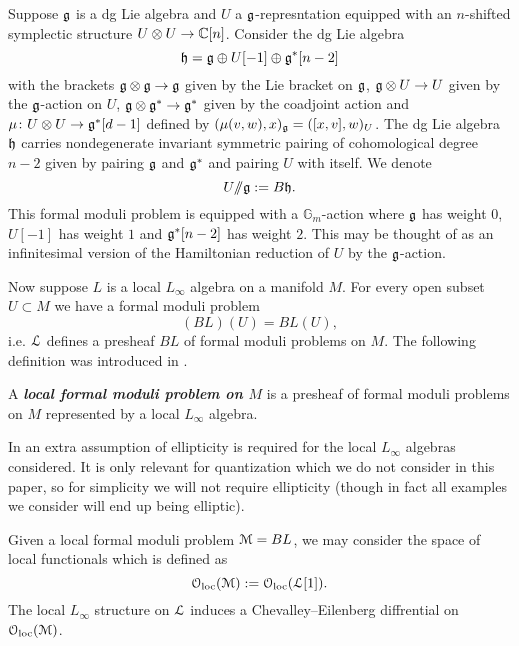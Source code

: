 \documentclass[10pt, oneside]{article}
\newcommand{\Gm}{\mathbb{G}_m}
\newcommand{\ham}{/\!\!/}
\newcommand{\defterm}[1]{\textbf{\emph{#1}}}
\begin{document}
\begin{example}
Suppose $\mathfrak g$ is a dg Lie algebra and $U$ a $\mathfrak g$-represntation equipped with an $n$-shifted symplectic structure $U\otimes U\rightarrow \mathbb C[n]$. Consider the dg Lie algebra
\[\mathfrak h = \mathfrak g\oplus U[-1]\oplus \mathfrak g^*[n-2]\]
with the brackets $\mathfrak g\otimes \mathfrak g\rightarrow \mathfrak g$ given by the Lie bracket on $\mathfrak g$, $\mathfrak g\otimes U\rightarrow U$ given by the $\mathfrak g$-action on $U$, $\mathfrak g\otimes \mathfrak g^*\rightarrow \mathfrak g^*$ given by the coadjoint action and $\mu\colon U\otimes U\rightarrow \mathfrak g^*[d-1]$ defined by $(\mu(v, w), x)_\mathfrak g = ([x, v], w)_U$. The dg Lie algebra $\mathfrak h$ carries nondegenerate invariant symmetric pairing of cohomological degree $n-2$ given by pairing $\mathfrak g$ and $\mathfrak g^*$ and pairing $U$ with itself. We denote
\[U\ham \fg := B\fh.\]
This formal moduli problem is equipped with a $\Gm$-action where $\mathfrak g$ has weight 0, $U[-1]$ has weight $1$ and $\mathfrak g^*[n-2]$ has weight $2$. This may be thought of as an infinitesimal version of the Hamiltonian reduction of $U$ by the $\mathfrak g$-action.
\end{example}

Now suppose $L$ is a local $L_\infty$ algebra on a manifold $M$. For every open subset $U\subset M$ we have a formal moduli problem
\[(B L)(U) = B L(U),\]
i.e. $\mathcal L$ defines a presheaf $B L$ of formal moduli problems on $M$. The following definition was introduced in \cite[Definition 4.1.3.3]{Book2}.

\begin{definition}
A \defterm{local formal moduli problem on $M$} is a presheaf of formal moduli problems on $M$ represented by a local $L_\infty$ algebra.
\end{definition}

\begin{remark}
In \cite{Book2} an extra assumption of ellipticity is required for the local $L_\infty$ algebras considered. It is only relevant for quantization which we do not consider in this paper, so for simplicity we will not require ellipticity (though in fact all examples we consider will end up being elliptic).
\end{remark}

Given a local formal moduli problem $\mathcal M=B L$, we may consider the space of local functionals which is defined as
\[\mathcal{O}_{\rm loc}(\mathcal M) := \mathcal{O}_{\rm loc}(\mathcal L[1]).\]
The local $L_\infty$ structure on $\mathcal L$ induces a Chevalley--Eilenberg diffrential on $\mathcal{O}_{\rm loc}(\mathcal M)$.
\end{document}
